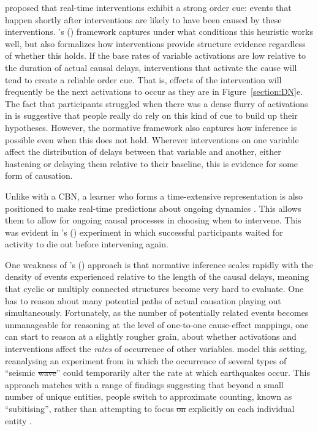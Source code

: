 \documentclass{cambridge7A}%
\def\citeapos#1{\citeauthor{#1}'s (\citeyear{#1})}
\providecommand{\DIFadd}[1]{{\protect\color{blue}\uwave{#1}}} %
\providecommand{\DIFdel}[1]{{\protect\color{red}\sout{#1}}}                      %
\providecommand{\DIFaddbegin}{} %
\providecommand{\DIFaddend}{} %
\providecommand{\DIFdelbegin}{} %
\providecommand{\DIFdelend}{} %
\newcommand{\DIFscaledelfig}{0.5}
\newlength{\DIFdelgraphicswidth} %
\newlength{\DIFdelgraphicsheight} %
\newcommand{\DIFaddincludegraphics}[2][]{{\color{blue}\fbox{\DIFOincludegraphics[#1]{#2}}}} %
\newcommand{\DIFdelincludegraphics}[2][]{%
\sbox{\DIFdelgraphicsbox}{\DIFOincludegraphics[#1]{#2}}%
\settoboxwidth{\DIFdelgraphicswidth}{\DIFdelgraphicsbox} %
\settoboxtotalheight{\DIFdelgraphicsheight}{\DIFdelgraphicsbox} %
\scalebox{\DIFscaledelfig}{%
\parbox[b]{\DIFdelgraphicswidth}{\usebox{\DIFdelgraphicsbox}\\[-\baselineskip] \rule{\DIFdelgraphicswidth}{0em}}\llap{\resizebox{\DIFdelgraphicswidth}{\DIFdelgraphicsheight}{%
\setlength{\unitlength}{\DIFdelgraphicswidth}%
\begin{picture}(1,1)%
\thicklines\linethickness{2pt} %
{\color[rgb]{1,0,0}\put(0,0){\framebox(1,1){}}}%
{\color[rgb]{1,0,0}\put(0,0){\line( 1,1){1}}}%
{\color[rgb]{1,0,0}\put(0,1){\line(1,-1){1}}}%
\end{picture}%
}\hspace*{3pt}}} %
} %
\DeclareRobustCommand{\DIFaddbegin}{\DIFOaddbegin \let\includegraphics\DIFaddincludegraphics} %
\DeclareRobustCommand{\DIFaddend}{\DIFOaddend \let\includegraphics\DIFOincludegraphics} %
\DeclareRobustCommand{\DIFdelbegin}{\DIFOdelbegin \let\includegraphics\DIFdelincludegraphics} %
\DeclareRobustCommand{\DIFdelend}{\DIFOaddend \let\includegraphics\DIFOincludegraphics} %
\begin{document}
\cite{lagnado2004advantage} proposed that real-time interventions exhibit a strong order cue: events that happen shortly after interventions are likely to have been caused by these interventions.  \citeapos{bramley2018time} framework captures under what conditions this heuristic works well, but also formalizes how interventions provide structure evidence regardless of whether this holds.  If the base rates of variable activations are low relative to the duration of actual causal delays, interventions that activate the cause will tend to create a reliable order cue.  That is, effects of the intervention will frequently be the next activations to occur as they are in Figure~\ref{section:DN}e.  The fact that participants struggled when there was a dense flurry of activations in \cite{bramley2017dynamic} is suggestive that people really do rely on this kind of cue to build up their hypotheses.  
However, the normative framework also captures how inference is possible even when this does not hold.  Wherever interventions on one variable affect the distribution of delays between that variable and another, either hastening or delaying them relative to their baseline, this is evidence for some form of causation.

Unlike with a CBN, a learner who forms a time-extensive representation is also positioned to make real-time predictions about ongoing dynamics \citep{clark2013whatever}.  This allows them to allow for ongoing causal processes in choosing when to intervene.   This was evident in \citeapos{bramley2017dynamic} experiment in which successful participants waited for activity to die out before intervening again.

One weakness of \citeapos{bramley2018time} approach is that normative inference scales rapidly with the density of events experienced relative to the length of the causal delays, meaning that cyclic or multiply connected structures become very hard to evaluate.  One has to reason about many potential paths of actual causation playing out simultaneously.  Fortunately, as the number of potentially related events becomes unmanageable for reasoning at the level of one-to-one cause-effect mappings, one can start to reason at a slightly rougher grain, about whether activations and interventions affect the \emph{rates} of occurrence of other variables.  \cite{pacer2015upsetting} model this setting, reanalysing an experiment from \cite{lagnado2010influence} in which the occurrence of several types of ``seismic \DIFdelbegin \DIFdel{wave}\DIFdelend \DIFaddbegin \DIFadd{waves}\DIFaddend '' could temporarily alter the rate at which earthquakes occur.  This approach matches with a range of findings suggesting that beyond a small number of unique entities, people switch to approximate counting, known as ``subitising'', rather than attempting to focus \DIFdelbegin \DIFdel{on }\DIFdelend explicitly on each individual entity \citep{mandler1982subitizing}.
\end{document}
